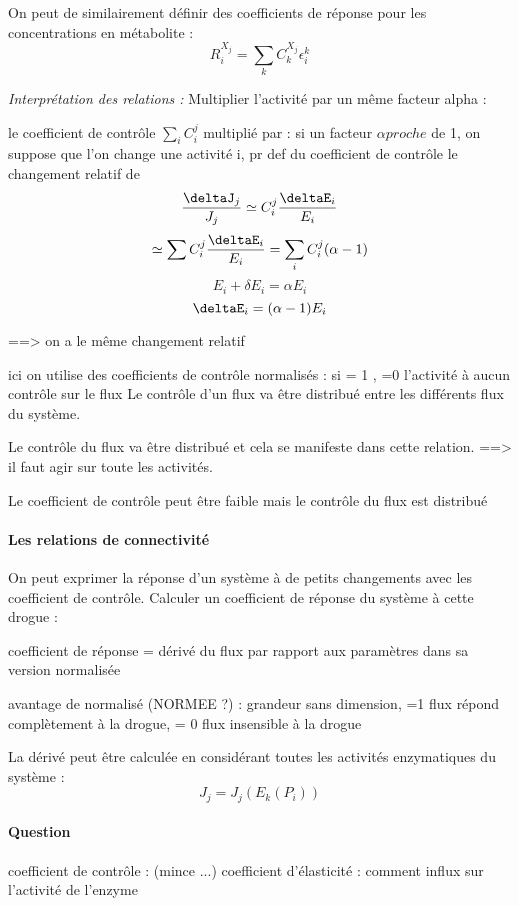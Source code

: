 On peut de similairement définir des coefficients de réponse pour les concentrations en métabolite :
$$ R_i^{X_j} = \sum_k C_k^{X_j} \epsilon_i^k $$


\textit{Interprétation des relations : }
Multiplier l'activité par un même facteur alpha :

le coefficient de contrôle $\sum_i C_i^j$  multiplié par :
 si un facteur $\alpha proche$ de 1, 
on suppose que l'on change une activité i, pr def du coefficient de contrôle le changement relatif de 
	$$\frac{\deltaJ_j}{J_j}\simeq C_i^j \frac{\deltaE_i}{E_i}$$
							$$ \simeq \sum C_i^j \frac{\deltaE_i}{E_i} = \sum _i C_i^j (\alpha - 1) $$
			$$ E_i + \delta E_i = \alpha E_i $$
			$$ \deltaE_i = (\alpha -1 ) E_i $$
			 	
 	==> on a le même changement relatif
 	
 	ici on utilise des coefficients de contrôle normalisés : si = 1 , 
 	=0 l'activité à aucun contrôle sur le flux
 	Le contrôle d'un flux va être distribué entre les différents flux du système.
 	
 	Le contrôle du flux va être distribué et cela se manifeste dans cette relation. 
 	==> il faut agir sur toute les activités.
 	
 	Le coefficient de contrôle peut être faible mais le contrôle du flux est distribué
 	
 	


\paragraph{Les relations de connectivité}

On peut exprimer la réponse d'un système à de petits changements avec les coefficient de contrôle. 
Calculer un coefficient de réponse du système à cette drogue :

coefficient de réponse = dérivé du flux par rapport aux paramètres dans sa version normalisée

avantage de normalisé (NORMEE ?) : grandeur sans dimension, =1 flux répond complètement à la drogue, = 0 flux insensible à la drogue

La dérivé peut être calculée en considérant toutes les activités enzymatiques du système :
$$ J_j = J_j(E_k(P_i)) $$



\paragraph{Question} 
coefficient de contrôle :	(mince ...) 
coefficient d'élasticité : comment influx sur l'activité de l'enzyme


